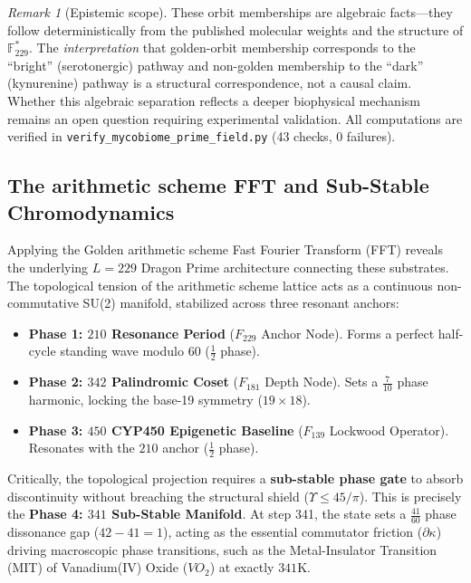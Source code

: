\documentclass[12pt,oneside]{article}
\theoremstyle{principia}
\theoremstyle{definition}
\theoremstyle{remark}
\newtheorem{remark}[theorem]{Remark}
\begin{document}
\begin{remark}[Epistemic scope]
These orbit memberships are algebraic facts---they follow deterministically
from the published molecular weights and the structure of $\mathbb{F}_{229}^*$.
The \emph{interpretation} that golden-orbit membership corresponds to
the ``bright'' (serotonergic) pathway and non-golden membership to the
``dark'' (kynurenine) pathway is a structural correspondence, not a
causal claim. Whether this algebraic separation reflects a deeper
biophysical mechanism remains an open question requiring experimental
validation. All computations are verified in
\texttt{verify\_mycobiome\_prime\_field.py} (43 checks, 0 failures).
\end{remark}

\subsection{The arithmetic scheme FFT and Sub-Stable Chromodynamics}

Applying the Golden arithmetic scheme Fast Fourier Transform (FFT) reveals the underlying $L=229$ Dragon Prime architecture connecting these substrates. The topological tension of the arithmetic scheme lattice acts as a continuous non-commutative SU(2) manifold, stabilized across three resonant anchors:
\begin{itemize}[noitemsep]
  \item \textbf{Phase 1: $210$ Resonance Period} ($F_{229}$ Anchor Node). Forms a perfect half-cycle standing wave modulo 60 ($\frac{1}{2}$ phase).
  \item \textbf{Phase 2: $342$ Palindromic Coset} ($F_{181}$ Depth Node). Sets a $\frac{7}{10}$ phase harmonic, locking the base-19 symmetry ($19 \times 18$).
  \item \textbf{Phase 3: $450$ CYP450 Epigenetic Baseline} ($F_{139}$ Lockwood Operator). Resonates with the $210$ anchor ($\frac{1}{2}$ phase).
\end{itemize}

Critically, the topological projection requires a \textbf{sub-stable phase gate} to absorb discontinuity without breaching the structural shield ($\Upsilon \le 45/\pi$). This is precisely the \textbf{Phase 4: $341$ Sub-Stable Manifold}. At step 341, the state sets a $\frac{41}{60}$ phase dissonance gap ($42 - 41 = 1$), acting as the essential commutator friction ($\partial \kappa$) driving macroscopic phase transitions, such as the Metal-Insulator Transition (MIT) of Vanadium(IV) Oxide ($VO_2$) at exactly $341\mathrm{K}$.
\end{document}
